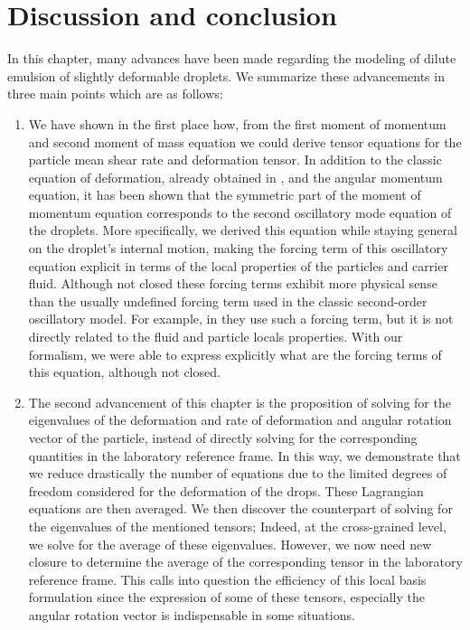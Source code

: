 \section{Discussion and conclusion}

In this chapter, many advances have been made regarding the modeling of dilute emulsion of slightly deformable droplets. 
We summarize these advancements in three main points which are as follows: 
\begin{enumerate}
    \item We have shown in the first place how, from the first moment of momentum and second moment of mass equation we could derive tensor equations for the particle mean shear rate and deformation tensor. 
In addition to the classic equation of deformation, already obtained in \citet{goddard1967nonlinear},  and the angular momentum equation, it has been shown that the symmetric part of the moment of momentum equation corresponds to the second oscillatory mode equation of the droplets. 
More specifically, we derived this equation while staying general on the droplet's internal motion, making the forcing term of this oscillatory equation explicit in terms of the local properties of the particles and carrier fluid. 
Although not closed these forcing terms exhibit more physical sense than the usually undefined forcing term used in the classic second-order oscillatory model.
For example, in \citet{riviere2021sub} they use such a forcing term, but it is not directly related to the fluid and particle locals properties.
With our formalism, we were able to express explicitly what are the forcing terms of this equation, although not closed. 

\item 
The second advancement of this chapter is the proposition of solving for the eigenvalues of the deformation and rate of deformation and angular rotation vector of the particle, instead of directly solving for the corresponding quantities in the laboratory reference frame. 
In this way, we demonstrate that we reduce drastically the number of equations due to the limited degrees of freedom considered for the deformation of the drops. 
These Lagrangian equations are then averaged. 
We then discover the counterpart of solving for the eigenvalues of the mentioned tensors; 
Indeed, at the cross-grained level, we solve for the average of these eigenvalues. 
However, we now need new closure to determine the average of the corresponding tensor in the laboratory reference frame.  
This calls into question the efficiency of this local basis formulation since the expression of some of these tensors, especially the angular rotation vector is indispensable in some situations. 


\end{enumerate}
